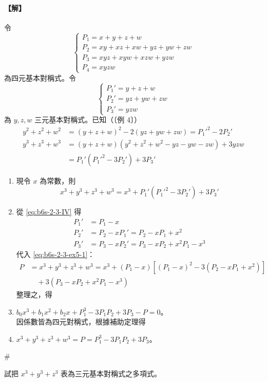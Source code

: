 \paragraph{【解】}
令
\[ \begin{cases}
P_1 = x+y+z+w \\
P_2 = xy+xz+xw+yz+yw+zw \\
P_3 = xyz+xyw+xzw+yzw \\
P_4 = xyzw
\end{cases} \]
為四元基本對稱式。令
\[ \begin{cases}
P_1' = y+z+w \\
P_2' = yz+yw+zw \\
P_3' = yzw
\end{cases} \]
為 $y, z, w$ 三元基本對稱式。已知（〔例 4〕）
\begin{align*}
y^2+z^2+w^2 &= (y+z+w)^2 - 2(yz+yw+zw) = P_1'^2 - 2P_2' \\
y^3+z^3+w^3 &= (y+z+w)(y^2+z^2+w^2-yz-yw-zw) + 3yzw \\
&= P_1'(P_1'^2 - 3P_2') + 3P_3'
\end{align*}
\begin{enumerate}[label=(\Roman*), leftmargin=2em]
  \item 現令 $x$ 為常數，則
  \begin{equation}
  x^3+y^3+z^3+w^3 = x^3 + P_1'(P_1'^2 - 3P_2') + 3P_3' \label{eq:b6s-2-3-ex5-1}
  \end{equation}
  \item 從 \eqref{eq:b6s-2-3-IV} 得
  \begin{align*}
  P_1' &= P_1 - x \\
  P_2' &= P_2 - x P_1' = P_2 - x P_1 + x^2 \\
  P_3' &= P_3 - x P_2' = P_3 - x P_2 + x^2 P_1 - x^3
  \end{align*}
  代入 \eqref{eq:b6s-2-3-ex5-1}：
  \begin{align*}
  P &= x^3+y^3+z^3+w^3 = x^3 + (P_1-x)[(P_1-x)^2 - 3(P_2 - x P_1 + x^2)] \\
  &\quad + 3(P_3 - x P_2 + x^2 P_1 - x^3)
  \end{align*}
  整理之，得
  \item $b_0 x^3 + b_1 x^2 + b_2 x + P_1^3 - 3P_1 P_2 + 3P_3 - P = 0$。\\
  因係數皆為四元對稱式，根據補助定理得
  \item $x^3+y^3+z^3+w^3 = P = P_1^3 - 3P_1 P_2 + 3P_3$。
\end{enumerate}
\hfill$\#$

\begin{example}\label{ex:b6s-2-13}
試把 $x^3+y^3+z^3$ 表為三元基本對稱式之多項式。
\end{example}

